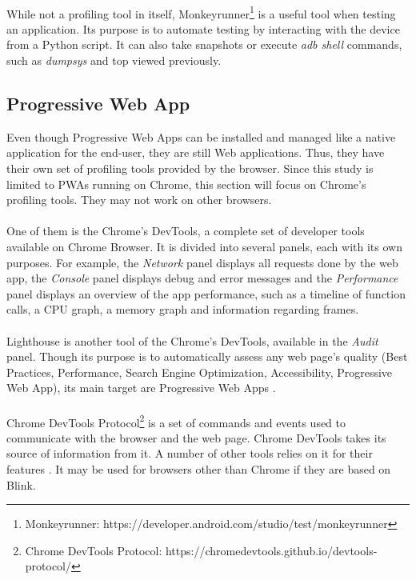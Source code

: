 \documentclass{kththesis}
\begin{document}
\paragraph{}
While not a profiling tool in itself, Monkeyrunner\footnote{Monkeyrunner: https://developer.android.com/studio/test/monkeyrunner} is a useful tool when testing an application. Its purpose is to automate testing by interacting with the device from a Python script. It can also take snapshots or execute \textit{adb shell} commands, such as \textit{dumpsys} and top viewed previously. 

\subsection{Progressive Web App}

Even though Progressive Web Apps can be installed and managed like a native application for the end-user, they are still Web applications. Thus, they have their own set of profiling tools provided by the browser. Since this study is limited to PWAs running on Chrome, this section will focus on Chrome's profiling tools. They may not work on other browsers.

\paragraph{}
One of them is the Chrome's DevTools, a complete set of developer tools available on Chrome Browser. It is divided into several panels, each with its own purposes. For example, the \textit{Network} panel displays all requests done by the web app, the \textit{Console} panel displays debug and error messages and the \textit{Performance} panel \cite{chrome_devtools_perf} displays an overview of the app performance, such as a timeline of function calls, a CPU graph, a memory graph and information regarding frames. 

\paragraph{}
Lighthouse \cite{lighthouse} is another tool of the Chrome's DevTools, available in the \textit{Audit} panel. Though its purpose is to automatically assess any web page's quality (Best Practices, Performance, Search Engine Optimization, Accessibility, Progressive Web App), its main target are Progressive Web Apps \cite{PWApossibleUnifer}. 

\paragraph{}
Chrome DevTools Protocol\footnote{Chrome DevTools Protocol: https://chromedevtools.github.io/devtools-protocol/} is a set of commands and events used to communicate with the browser and the web page. Chrome DevTools takes its source of information from it. A number of other tools relies on it for their features \cite{awesome_CDP}. It may be used for browsers other than Chrome if they are based on Blink.
\end{document}
